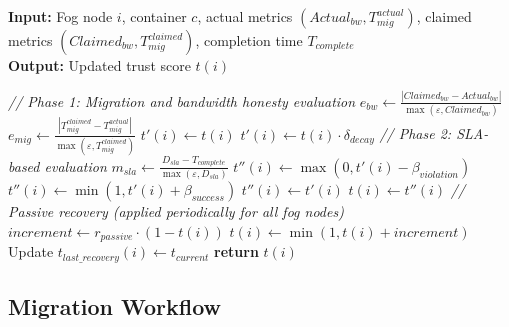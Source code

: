 \documentclass{article}
\begin{document}
\begin{algorithm}[h!]
\caption{Trust Evaluation for Node $i$ and Passive Recovery}
\label{alg:trust_update}
 \textbf{Input:} Fog node $i$, container $c$, actual metrics $(Actual_{bw}, T^{actual}_{mig})$, claimed metrics $(Claimed_{bw}, T^{claimed}_{mig})$, completion time $T_{complete}$
\\ \textbf{Output:} Updated trust score $t(i)$
\begin{algorithmic}[1]
\State
\State \textit{// Phase 1: Migration and bandwidth honesty evaluation}
\State $e_{bw} \gets \frac{|Claimed_{bw} - Actual_{bw}|}{\max(\varepsilon, Claimed_{bw})}$
\State $e_{mig} \gets \frac{|T^{claimed}_{mig} - T^{actual}_{mig}|}{\max(\varepsilon, T^{claimed}_{mig})}$
\State
\State $t'(i) \gets t(i)$ 
    \State $t'(i) \gets t(i) \cdot \delta_{decay}$ 
\EndIf
\State
\State \textit{// Phase 2: SLA-based evaluation}
\State $m_{sla} \gets \frac{D_{sla} - T_{complete}}{\max(\varepsilon, D_{sla})}$
\State
{}
    \State $t''(i) \gets \max(0, t'(i) - \beta_{violation})$ 
\Else
        \State $t''(i) \gets \min(1, t'(i) + \beta_{success})$ 
    \Else
        \State $t''(i) \gets t'(i)$ 
    \EndIf
\EndIf
\State
\State $t(i) \gets t''(i)$ 
\State
\State \textit{// Passive recovery (applied periodically for all fog nodes)}
        \State $increment \gets r_{passive} \cdot (1 - t(i))$
        \State $t(i) \gets \min(1, t(i) + increment)$
        \State Update $t_{last\_recovery}(i) \gets t_{current}$
    \EndIf
\EndProcedure
\State
\State \textbf{return} $t(i)$
\end{algorithmic}
\end{algorithm}


\subsection{Migration Workflow}
\end{document}
